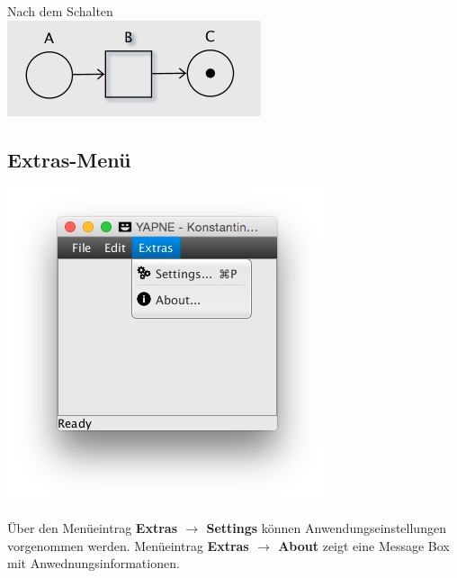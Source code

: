 \documentclass[12pt]{article}
\begin{document}
\begin{itemize}
Nach dem Schalten \\
\includegraphics[scale=0.5]{trans_after}
\end{itemize}



\subsection{Extras-Menü} 

\includegraphics{menu_extras}

Über den Menüeintrag \textbf{Extras $\rightarrow$ Settings} können Anwendungseinstellungen vorgenommen werden. Menüeintrag \textbf{Extras $\rightarrow$ About} zeigt eine Message Box mit Anwednungsinformationen.
\end{document}
